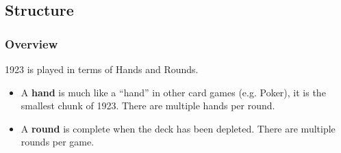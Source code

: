 \documentclass[11pt]{article}
\begin{document}
\subsection{Structure}
\label{sec-2-2}
\subsubsection{Overview}
\label{sec-2-2-1}

1923 is played in terms of Hands and Rounds.   

\begin{itemize}
\item A \textbf{hand} is much like a ``hand'' in other card games (e.g. Poker), it is
  the smallest chunk of 1923. There are multiple hands per round.
\item A \textbf{round} is complete when the deck has been depleted. There are
  multiple rounds per game.
\end{itemize}
\end{document}
